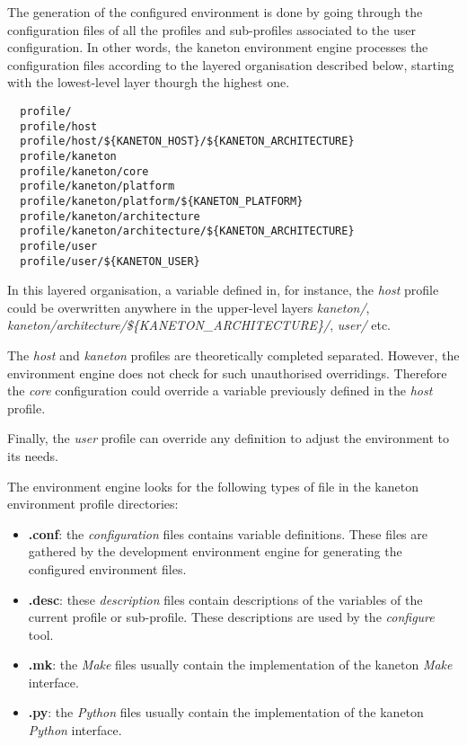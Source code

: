 The generation of the configured environment is done by going through
the configuration files of all the profiles and sub-profiles associated
to the user configuration. In other words, the kaneton environment engine
processes the configuration files according to the layered organisation
described below, starting with the lowest-level layer thourgh the highest one.

\begin{verbatim}
  profile/
  profile/host
  profile/host/${KANETON_HOST}/${KANETON_ARCHITECTURE}
  profile/kaneton
  profile/kaneton/core
  profile/kaneton/platform
  profile/kaneton/platform/${KANETON_PLATFORM}
  profile/kaneton/architecture
  profile/kaneton/architecture/${KANETON_ARCHITECTURE}
  profile/user
  profile/user/${KANETON_USER}         
\end{verbatim}

In this layered organisation, a variable defined in, for instance, the
\textit{host} profile could be overwritten anywhere in the upper-level layers
\textit{kaneton/}, \textit{kaneton/architecture/\$\{KANETON\_ARCHITECTURE\}/},
\textit{user/} etc.

The \textit{host} and \textit{kaneton} profiles are theoretically completed
separated. However, the environment engine does not check for such
unauthorised overridings. Therefore the \textit{core} configuration could
override a variable previously defined in the \textit{host} profile.

Finally, the \textit{user} profile can override any definition to adjust the
environment to its needs.

The environment engine looks for the following types of file in the
kaneton environment profile directories:

\begin{itemize}
  \item
    \textbf{.conf}: the \textit{configuration} files contains variable
    definitions. These files are gathered by the development environment
    engine for generating the configured environment files.
  \item
    \textbf{.desc}: these \textit{description} files contain descriptions of
    the variables of the current profile or sub-profile. These descriptions
    are used by the \textit{configure} tool.
  \item
    \textbf{.mk}: the \textit{Make} files usually contain the implementation
    of the kaneton \textit{Make} interface.
  \item
    \textbf{.py}: the \textit{Python} files usually contain the
    implementation of the kaneton \textit{Python} interface.
\end{itemize}

